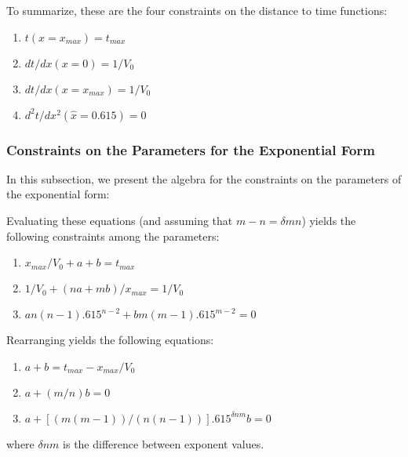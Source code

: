 \documentclass{article}
\begin{document}
To summarize, these are the four constraints on the distance to time functions:
\begin{enumerate}
\item $t(x = x_{max}) = t_{max}$
\item $dt / dx (x = 0) = 1 / V_0$
\item $dt / dx (x = x_{max}) = 1 / V_0$
\item $d^2 t / dx^2 (\hat{x} = 0.615 ) = 0$   
\end{enumerate}

\subsubsection{Constraints on the Parameters for the Exponential Form}
In this subsection, we present the algebra for the constraints on the parameters
of the exponential form:

Evaluating these equations (and assuming that $m-n = \delta mn$)
yields the following constraints among the parameters:
\begin{enumerate}
\item $x_{max}/V_0 + a + b = t_{max}$
\item $1/V_0 + (na+mb)/x_{max} = 1/V_0$
\item $a n (n-1) .615^{n-2} + b m (m-1) .615^{m-2} = 0$
\end{enumerate}

Rearranging yields the following equations:
\begin{enumerate}
\item $a + b = t_{max} - x_{max}/V_0$
\item $a + (m/n) b = 0$
\item $a + [(m(m-1))/(n(n-1))] .615^{\delta nm} b = 0$
\end{enumerate}
where $\delta nm$ is the difference between exponent values.
	
\end{document}
